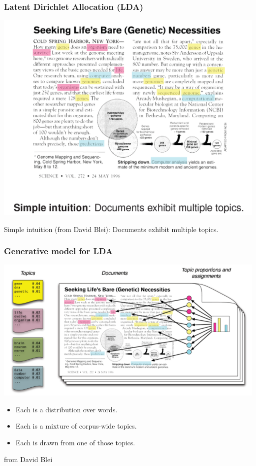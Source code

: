 \begin{frame}
\frametitle{Latent Dirichlet Allocation (LDA)}

\centerline{\includegraphics[width=\textwidth]{LDA_toy_graph1}}

Simple intuition (from David Blei): Documents exhibit multiple topics.

\end{frame}


\begin{frame}
\frametitle{Generative model for LDA}

\centerline{\includegraphics[width=\textwidth]{LDA_toy_graph2}}

\begin{itemize}
\item Each  is a distribution over words.
\item Each  is a mixture of corpus-wide topics.
\item Each  is drawn from one of those topics.
\end{itemize}
\hfill{\tiny from David Blei}
\end{frame}


